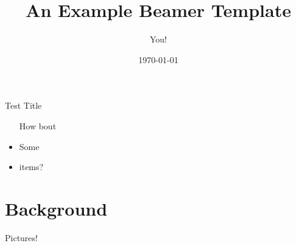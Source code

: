 \documentclass{beamer}
\title[Bottom-left title]{An Example Beamer Template}
\author{You!}
\institute{Colorado School of Mines, probably}
\date{\today}
\begin{document}
\begin{frame}
\titlepage
\end{frame}

 \begin{frame}{Test Title}
\begin{itemize}
\item[How] bout
\item Some
\item items?
\end{itemize}
\end{frame}

\section{Background}
\begin{frame}{Pictures!}
\begin{minipage}{\linewidth}
\\
\end{minipage}
\end{frame}
\end{document}
